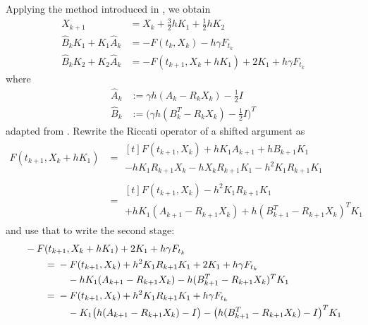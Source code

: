 Applying the method introduced in \cite{Verwer1999}, we obtain
\begin{subequations}\label{eq:mena:stages}
\begin{align}
  X_{k+1} &= X_k + \tfrac{3}{2} h K_1 + \tfrac{1}{2} h K_2 \\
  \hat{B}_k K_1 + K_1 \hat{A}_k &= -F(t_k, X_k) - h\gamma F_{t_k} \\
  \hat{B}_k K_2 + K_2 \hat{A}_k &= -F(t_{k+1}, X_k + hK_1) + 2K_1 + h\gamma F_{t_k}
\end{align}
\end{subequations}
where
\begin{subequations} \label{eq:mena:coeffs}
\begin{align}
  \hat{A}_k &:= \gamma h (A_k - R_k X_k) - \tfrac{1}{2} I \\
  \hat{B}_k &:= \big( \gamma h (B^T_k - R_k X_k) - \tfrac{1}{2} I \big)^T
\end{align}
\end{subequations}
adapted from \cite[Equations (4.37) to (4.39)]{Mena2007}.
Rewrite the Riccati operator of a shifted argument as
\begin{subequations}
\begin{align}
  F(t_{k+1}, X_k + hK_1)
  &= \begin{multlined}[t]
    F(t_{k+1}, X_k) + h K_1 A_{k+1} + h B_{k+1} K_1 \\
    - h K_1 R_{k+1} X_k - h X_k R_{k+1} K_1 - h^2 K_1 R_{k+1} K_1
  \end{multlined} \\
  &= \begin{multlined}[t]
    F(t_{k+1}, X_k) - h^2 K_1 R_{k+1} K_1 \\
    + h K_1 (A_{k+1} - R_{k+1} X_k) + h(B^T_{k+1} - R_{k+1} X_k)^T K_1
  \end{multlined}
\end{align}
\end{subequations}
and use that to write the second stage:
\begin{subequations}\label{eq:mena:stage2:rhs}
\begin{align}
  \MoveEqLeft
  -F(t_{k+1}, X_k + hK_1) + 2K_1 + h\gamma F_{t_k}
  \nonumber \\
  &= \begin{multlined}[t]
    -F(t_{k+1}, X_k) + h^2 K_1 R_{k+1} K_1 + 2K_1 + h\gamma F_{t_k}\\
    - h K_1 (A_{k+1} - R_{k+1} X_k) - h(B_{k+1}^T - R_{k+1} X_k)^T K_1
  \end{multlined} \\
  &= \begin{multlined}[t]
    -F(t_{k+1}, X_k) + h^2 K_1 R_{k+1} K_1 + h\gamma F_{t_k}\\
    - K_1 \big(h(A_{k+1} - R_{k+1} X_k) - I\big)
    - \big(h(B_{k+1}^T - R_{k+1} X_k) - I\big)^T K_1
  \end{multlined}
\end{align}
\end{subequations}


